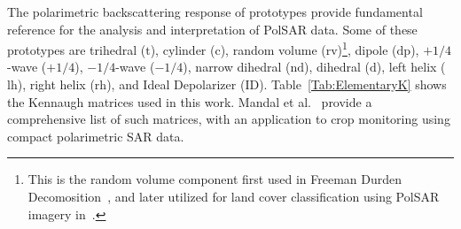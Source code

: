 \documentclass[journal]{IEEEtran}
\begin{document}
	The polarimetric backscattering response of prototypes provide fundamental reference for the  analysis and interpretation of PolSAR data.
	Some of these prototypes are
	{trihedral} ($\text{t}$),
	{cylinder} (${\text{c}}$),
	{random volume} (${\text{rv}}$)\footnote{This is the random volume component first used in Freeman Durden Decomosition~\cite{freeman98}, and later utilized for land cover classification using PolSAR imagery in~\cite{ClassificationPolSARGeodesic}.},%
	{dipole} (${\text{dp}}$),
	{$+1/4$-wave} (${+1/4}$), 
	{$-1/4$-wave} (${-1/4}$),
	{narrow dihedral} (${\text{nd}}$),
	{dihedral} (${\text{d}}$),
	{left helix} (${\text{lh}}$), 
	{right helix} (${\text{rh}}$), 
	and Ideal Depolarizer (${\text{ID}}$).
	Table~\ref{Tab:ElementaryK} shows the Kennaugh matrices used in this work. Mandal et al.~\cite{ARadarVegetationIndexforCropMonitoringUsingCompactPolarimetricSARData} provide a comprehensive list of such matrices, with an application to crop monitoring using compact polarimetric SAR data.%
	
	
\end{document}
